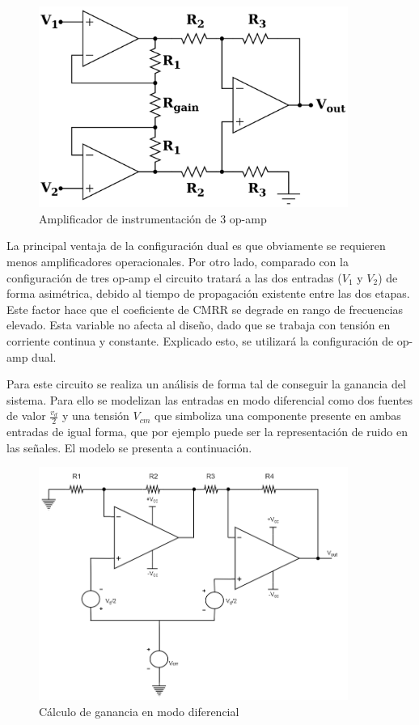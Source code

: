 \begin{figure}[H]
    \centering
    \includegraphics[width=0.9\textwidth]{../EJ4/resources/instrumental_3opamp.png}
    \caption{Amplificador de instrumentaci\'on de 3 op-amp}
    \label{fig:EJ4_instrumental_3opamp}
\end{figure}
 
 La principal ventaja de la configuraci\'on dual es que obviamente se requieren menos amplificadores operacionales. Por otro lado, comparado con la configuraci\'on de tres op-amp el circuito tratar\'a a las dos entradas ($V_1$ y $V_2$) de forma asim\'etrica, debido al tiempo de propagaci\'on existente entre las dos etapas. Este factor hace que el coeficiente de CMRR se degrade en rango de frecuencias elevado. Esta variable no afecta al diseño, dado que se trabaja con tensi\'on en corriente continua y constante. Explicado esto, se utilizar\'a la configuraci\'on de op-amp dual.
 
 
Para este circuito se realiza un an\'alisis de forma tal de conseguir la ganancia del sistema. Para ello se modelizan las entradas en modo diferencial como dos fuentes de valor $\frac{v_d}{2}$ y una tensi\'on $V_{cm}$ que simboliza una componente presente en ambas entradas de igual forma, que por ejemplo puede ser la representaci\'on de ruido en las se\~nales. El modelo se presenta a continuaci\'on.

\begin{figure}[H]
    \centering
    \includegraphics[width=0.9\textwidth]{../EJ4/resources/2opamp_difmode_gain.png}
    \caption{C\'alculo de ganancia en modo diferencial}
    \label{fig:EJ4_2opamp_difmode_gain}
\end{figure}


